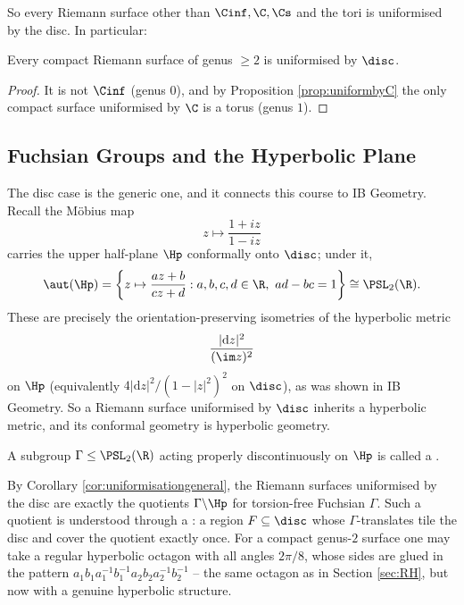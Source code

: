 So every Riemann surface other than $\Cinf, \C, \Cs$ and the tori is uniformised by the
disc. In particular:

\begin{corollary}
	Every compact Riemann surface of genus $\geq 2$ is uniformised by $\disc$.
\end{corollary}

\begin{proof}
	It is not $\Cinf$ (genus $0$), and by Proposition \ref{prop:uniformbyC} the only compact
	surface uniformised by $\C$ is a torus (genus $1$).
\end{proof}

\subsection{Fuchsian Groups and the Hyperbolic Plane}

The disc case is the generic one, and it connects this course to IB Geometry. Recall the
M\"obius map
$$
z \mapsto \frac{1+iz}{1-iz}
$$
carries the upper half-plane $\Hp$ conformally onto $\disc$; under it,
$$
\aut(\Hp) = \left\{z\mapsto\frac{az+b}{cz+d} : a,b,c,d\in\R,\ ad-bc=1\right\} \cong \PSL_2(\R).
$$
These are precisely the orientation-preserving isometries of the hyperbolic metric
$$
\frac{|\mathrm{d}z|^2}{(\im z)^2}
$$
on $\Hp$ (equivalently $4|\mathrm{d}z|^2/(1-|z|^2)^2$ on $\disc$), as was shown in IB Geometry.
So a Riemann surface uniformised by $\disc$ inherits a hyperbolic metric, and its
conformal geometry is hyperbolic geometry.

\begin{definition}
	A subgroup $\Gamma \leq \PSL_2(\R)$ acting properly discontinuously on $\Hp$ is called
	a .
\end{definition}

By Corollary \ref{cor:uniformisationgeneral}, the Riemann surfaces uniformised by the disc
are exactly the quotients $\Gamma\backslash\Hp$ for torsion-free Fuchsian $\Gamma$. Such a
quotient is understood through a : a region $F \subseteq \disc$
whose $\Gamma$-translates tile the disc and cover the quotient exactly once. For a compact
genus-$2$ surface one may take a regular hyperbolic octagon with all angles $2\pi/8$,
whose sides are glued in the pattern $a_1b_1a_1^{-1}b_1^{-1}a_2b_2a_2^{-1}b_2^{-1}$ --
the same octagon as in Section \ref{sec:RH}, but now with a genuine hyperbolic structure.

